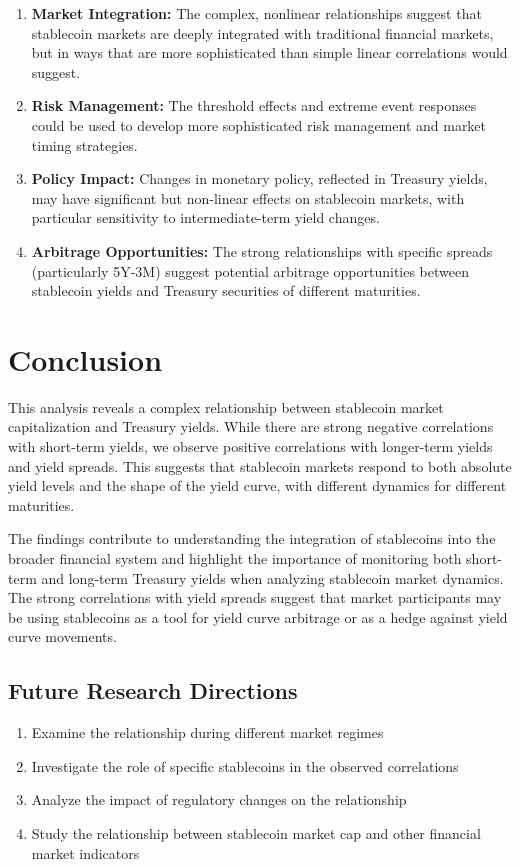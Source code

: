 \documentclass[12pt,a4paper]{article}
\begin{document}
\begin{enumerate}
    \item \textbf{Market Integration:} The complex, nonlinear relationships suggest that stablecoin markets are deeply integrated with traditional financial markets, but in ways that are more sophisticated than simple linear correlations would suggest.
    
    \item \textbf{Risk Management:} The threshold effects and extreme event responses could be used to develop more sophisticated risk management and market timing strategies.
    
    \item \textbf{Policy Impact:} Changes in monetary policy, reflected in Treasury yields, may have significant but non-linear effects on stablecoin markets, with particular sensitivity to intermediate-term yield changes.
    
    \item \textbf{Arbitrage Opportunities:} The strong relationships with specific spreads (particularly 5Y-3M) suggest potential arbitrage opportunities between stablecoin yields and Treasury securities of different maturities.
\end{enumerate}

\section{Conclusion}
This analysis reveals a complex relationship between stablecoin market capitalization and Treasury yields. While there are strong negative correlations with short-term yields, we observe positive correlations with longer-term yields and yield spreads. This suggests that stablecoin markets respond to both absolute yield levels and the shape of the yield curve, with different dynamics for different maturities.

The findings contribute to understanding the integration of stablecoins into the broader financial system and highlight the importance of monitoring both short-term and long-term Treasury yields when analyzing stablecoin market dynamics. The strong correlations with yield spreads suggest that market participants may be using stablecoins as a tool for yield curve arbitrage or as a hedge against yield curve movements.

\subsection{Future Research Directions}
\begin{enumerate}
    \item Examine the relationship during different market regimes
    \item Investigate the role of specific stablecoins in the observed correlations
    \item Analyze the impact of regulatory changes on the relationship
    \item Study the relationship between stablecoin market cap and other financial market indicators
\end{enumerate}

\balance  %
\end{document}
